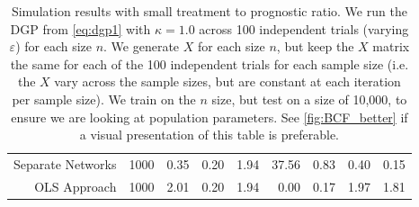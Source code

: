 \documentclass[11pt,  dvipsnames, table, x11name]{article}
\begin{document}
\begin{table}[!httb]
{\begin{tabular}{rrrrrrrrr}
			Separate Networks &1000 &    0.35 &           0.20 &             1.94 &         37.56 &       0.83 &       0.40 &       0.15 \\
			OLS Approach &1000 &       2.01 &           0.20 &             1.94 &          0.00 &       0.17 &       1.97 &       1.81 \\
			\bottomrule
		\end{tabular}
	}
	\caption{Simulation results with small treatment to prognostic ratio.  We run the DGP from \autoref{eq:dgp1} with $\kappa=1.0$ across 100 independent trials (varying $\varepsilon$) for each size $n$.  We generate $X$ for each size $n$, but keep the $X$ matrix the same for each of the 100 independent trials for each sample size (i.e. the $X$ vary across the sample sizes, but are constant at each iteration per sample size).  We train on the $n$ size, but test on a size of 10,000, to ensure we are looking at population parameters.  See \autoref{fig:BCF_better} if a visual presentation of this table is preferable. }
\label{tab:sim_results_smalltreat}
\end{table}
\end{document}
